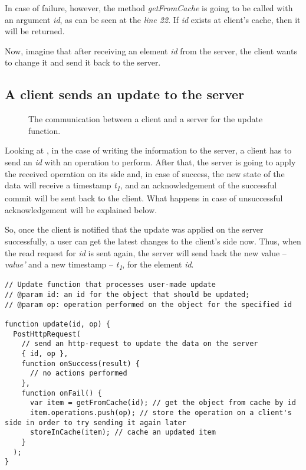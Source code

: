 In case of failure, however, the method \textit{getFromCache} is going to be called with an argument \textit{id}, as can be seen at the \textit{line 22}. If \textit{id} exists at client's cache, then it will be returned. 


Now, imagine that after receiving an element \textit{id} from the server, the client wants to change it and send it back to the server.

\subsection*{A client sends an update to the server}

\begin{figure}[!htb]
    \begin{center}
    \def\svgwidth{\linewidth}
    
    \caption {The communication between a client and a server for the update function.}
    \label{fig:design3}
\end{center}
\end{figure}

Looking at , in the case of writing the information to the server, a client has to send an \textit{id} with an operation to perform. After that, the server is going to apply the received operation on its side and, in case of success, the new state of the data will receive a timestamp \textit{t\textsubscript{1}}, and an acknowledgement of the successful commit will be sent back to the client. What happens in case of unsuccessful acknowledgement will be explained below. 

So, once the client is notified that the update was applied on the server successfully, a user can get the latest changes to the client's side now. Thus, when the read request for \textit{id} is sent again, the server will send back the new value -- \textit{value'} and a new timestamp -- \textit{t\textsubscript{1}}, for the element \textit{id}.

\begin{lstlisting}[caption={Pseudocode for making a request to change the data: client.}, label={lst:update1}]
// Update function that processes user-made update
// @param id: an id for the object that should be updated;
// @param op: operation performed on the object for the specified id

function update(id, op) {
  PostHttpRequest(
    // send an http-request to update the data on the server
    { id, op },
    function onSuccess(result) {
      // no actions performed
    },
    function onFail() {
      var item = getFromCache(id); // get the object from cache by id
      item.operations.push(op); // store the operation on a client's side in order to try sending it again later
      storeInCache(item); // cache an updated item
    }
  );
}
\end{lstlisting} 


